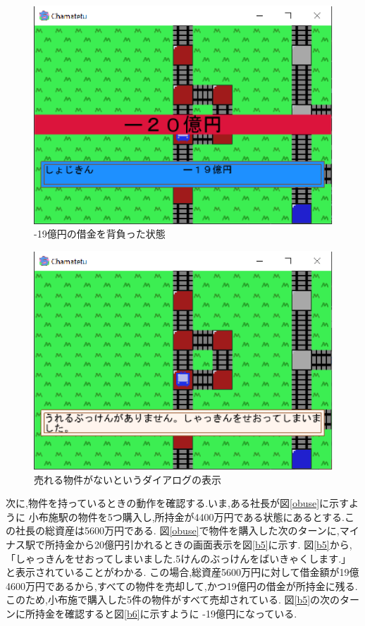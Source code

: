 \documentclass[a4j]{jarticle}
\begin{document}
    \begin{figure}[H]
        \centering
        \includegraphics[scale=1.3]{minus20.eps}
        \caption{-19億円の借金を背負った状態}
         \label{minus20}
        \end{figure}

    \begin{figure}[H]
        \centering
        \includegraphics[scale=1.3]{minus20result.eps}
        \caption{売れる物件がないというダイアログの表示}
         \label{minus20result}
        \end{figure}

    次に,物件を持っているときの動作を確認する.いま,ある社長が図\ref{obuse}に示すように
    小布施駅の物件を5つ購入し,所持金が4400万円である状態にあるとする.この社長の総資産は5600万円である.
    図\ref{obuse}で物件を購入した次のターンに,マイナス駅で所持金から20億円引かれるときの画面表示を図\ref{b5}に示す.
    図\ref{b5}から,「しゃっきんをせおってしまいました.5けんのぶっけんをばいきゃくします.」と表示されていることがわかる.
    この場合,総資産5600万円に対して借金額が19億4600万円であるから,すべての物件を売却して,かつ19億円の借金が所持金に残る.
    このため,小布施で購入した5件の物件がすべて売却されている. 図\ref{b5}の次のターンに所持金を確認すると図\ref{b6}に示すように
    -19億円になっている.
\end{document}
